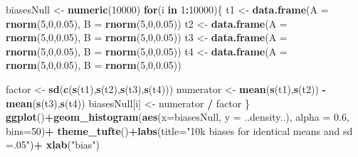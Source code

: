 \documentclass[10pt,dvipsnames,enabledeprecatedfontcommands]{scrartcl}
\newenvironment{Shaded}{\begin{snugshade}}{\end{snugshade}}
\newcommand{\KeywordTok}[1]{\textcolor[rgb]{0.13,0.29,0.53}{\textbf{#1}}}
\newcommand{\DataTypeTok}[1]{\textcolor[rgb]{0.13,0.29,0.53}{#1}}
\newcommand{\DecValTok}[1]{\textcolor[rgb]{0.00,0.00,0.81}{#1}}
\newcommand{\FloatTok}[1]{\textcolor[rgb]{0.00,0.00,0.81}{#1}}
\newcommand{\StringTok}[1]{\textcolor[rgb]{0.31,0.60,0.02}{#1}}
\newcommand{\ControlFlowTok}[1]{\textcolor[rgb]{0.13,0.29,0.53}{\textbf{#1}}}
\newcommand{\OperatorTok}[1]{\textcolor[rgb]{0.81,0.36,0.00}{\textbf{#1}}}
\newcommand{\NormalTok}[1]{#1}
\begin{document}
\begin{Shaded}
\begin{Highlighting}[]
\NormalTok{biasesNull <-}\StringTok{ }\KeywordTok{numeric}\NormalTok{(}\DecValTok{10000}\NormalTok{)}
\ControlFlowTok{for}\NormalTok{(i }\ControlFlowTok{in} \DecValTok{1}\OperatorTok{:}\DecValTok{10000}\NormalTok{)\{}
\NormalTok{t1 <-}\StringTok{ }\KeywordTok{data.frame}\NormalTok{(}\DataTypeTok{A  =} \KeywordTok{rnorm}\NormalTok{(}\DecValTok{5}\NormalTok{,}\DecValTok{0}\NormalTok{,}\FloatTok{0.05}\NormalTok{), }\DataTypeTok{B =} \KeywordTok{rnorm}\NormalTok{(}\DecValTok{5}\NormalTok{,}\DecValTok{0}\NormalTok{,}\FloatTok{0.05}\NormalTok{))}
\NormalTok{t2 <-}\StringTok{ }\KeywordTok{data.frame}\NormalTok{(}\DataTypeTok{A  =} \KeywordTok{rnorm}\NormalTok{(}\DecValTok{5}\NormalTok{,}\DecValTok{0}\NormalTok{,}\FloatTok{0.05}\NormalTok{), }\DataTypeTok{B =} \KeywordTok{rnorm}\NormalTok{(}\DecValTok{5}\NormalTok{,}\DecValTok{0}\NormalTok{,}\FloatTok{0.05}\NormalTok{))}
\NormalTok{t3 <-}\StringTok{ }\KeywordTok{data.frame}\NormalTok{(}\DataTypeTok{A  =} \KeywordTok{rnorm}\NormalTok{(}\DecValTok{5}\NormalTok{,}\DecValTok{0}\NormalTok{,}\FloatTok{0.05}\NormalTok{), }\DataTypeTok{B =} \KeywordTok{rnorm}\NormalTok{(}\DecValTok{5}\NormalTok{,}\DecValTok{0}\NormalTok{,}\FloatTok{0.05}\NormalTok{))}
\NormalTok{t4 <-}\StringTok{ }\KeywordTok{data.frame}\NormalTok{(}\DataTypeTok{A  =} \KeywordTok{rnorm}\NormalTok{(}\DecValTok{5}\NormalTok{,}\DecValTok{0}\NormalTok{,}\FloatTok{0.05}\NormalTok{), }\DataTypeTok{B =} \KeywordTok{rnorm}\NormalTok{(}\DecValTok{5}\NormalTok{,}\DecValTok{0}\NormalTok{,}\FloatTok{0.05}\NormalTok{))}

\NormalTok{factor <-}\StringTok{ }\KeywordTok{sd}\NormalTok{(}\KeywordTok{c}\NormalTok{(}\KeywordTok{s}\NormalTok{(t1),}\KeywordTok{s}\NormalTok{(t2),}\KeywordTok{s}\NormalTok{(t3),}\KeywordTok{s}\NormalTok{(t4)))}
\NormalTok{numerator <-}\StringTok{  }\KeywordTok{mean}\NormalTok{(}\KeywordTok{s}\NormalTok{(t1),}\KeywordTok{s}\NormalTok{(t2)) }\OperatorTok{-}\StringTok{ }\KeywordTok{mean}\NormalTok{(}\KeywordTok{s}\NormalTok{(t3),}\KeywordTok{s}\NormalTok{(t4))}
\NormalTok{biasesNull[i]  <-}\StringTok{ }\NormalTok{numerator }\OperatorTok{/}\StringTok{ }\NormalTok{factor}
\NormalTok{\}}
\KeywordTok{ggplot}\NormalTok{()}\OperatorTok{+}\KeywordTok{geom_histogram}\NormalTok{(}\KeywordTok{aes}\NormalTok{(}\DataTypeTok{x=}\NormalTok{biasesNull, }\DataTypeTok{y =}\NormalTok{ ..density..), }\DataTypeTok{alpha =} \FloatTok{0.6}\NormalTok{, }\DataTypeTok{bins=}\DecValTok{50}\NormalTok{)}\OperatorTok{+}
\StringTok{  }\KeywordTok{theme_tufte}\NormalTok{()}\OperatorTok{+}\KeywordTok{labs}\NormalTok{(}\DataTypeTok{title=}\StringTok{"10k biases for identical means and sd =.05"}\NormalTok{)}\OperatorTok{+}\StringTok{ }\KeywordTok{xlab}\NormalTok{(}\StringTok{"bias"}\NormalTok{)}
\end{Highlighting}
\end{Shaded}
\end{document}
